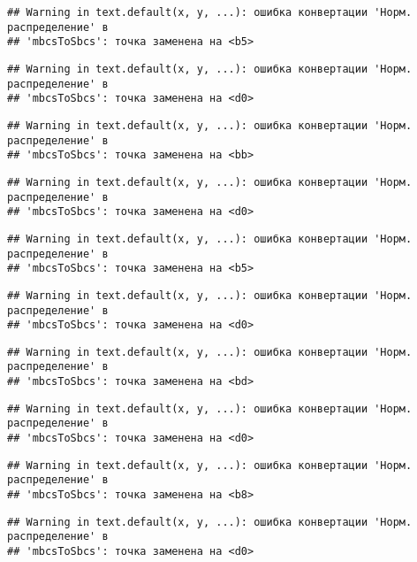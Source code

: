\documentclass[
]{article}
\begin{document}
\begin{verbatim}
## Warning in text.default(x, y, ...): ошибка конвертации 'Норм. распределение' в
## 'mbcsToSbcs': точка заменена на <b5>
\end{verbatim}

\begin{verbatim}
## Warning in text.default(x, y, ...): ошибка конвертации 'Норм. распределение' в
## 'mbcsToSbcs': точка заменена на <d0>
\end{verbatim}

\begin{verbatim}
## Warning in text.default(x, y, ...): ошибка конвертации 'Норм. распределение' в
## 'mbcsToSbcs': точка заменена на <bb>
\end{verbatim}

\begin{verbatim}
## Warning in text.default(x, y, ...): ошибка конвертации 'Норм. распределение' в
## 'mbcsToSbcs': точка заменена на <d0>
\end{verbatim}

\begin{verbatim}
## Warning in text.default(x, y, ...): ошибка конвертации 'Норм. распределение' в
## 'mbcsToSbcs': точка заменена на <b5>
\end{verbatim}

\begin{verbatim}
## Warning in text.default(x, y, ...): ошибка конвертации 'Норм. распределение' в
## 'mbcsToSbcs': точка заменена на <d0>
\end{verbatim}

\begin{verbatim}
## Warning in text.default(x, y, ...): ошибка конвертации 'Норм. распределение' в
## 'mbcsToSbcs': точка заменена на <bd>
\end{verbatim}

\begin{verbatim}
## Warning in text.default(x, y, ...): ошибка конвертации 'Норм. распределение' в
## 'mbcsToSbcs': точка заменена на <d0>
\end{verbatim}

\begin{verbatim}
## Warning in text.default(x, y, ...): ошибка конвертации 'Норм. распределение' в
## 'mbcsToSbcs': точка заменена на <b8>
\end{verbatim}

\begin{verbatim}
## Warning in text.default(x, y, ...): ошибка конвертации 'Норм. распределение' в
## 'mbcsToSbcs': точка заменена на <d0>
\end{verbatim}
\end{document}
